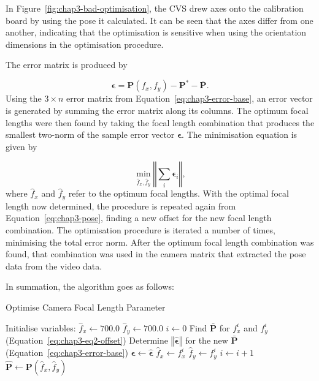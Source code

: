 In Figure~\ref{fig:chap3-bad-optimisation}, the CVS drew axes onto the calibration board by using the pose it calculated. It can be seen that the axes differ from one another, indicating that the optimisation is sensitive when using the orientation dimensions in the optimisation procedure. 

The error matrix is produced by

\begin{equation}
  \label{eq:chap3-error-base}
  \bm{\epsilon} = \bm{P}(f_x, f_y) - \bm{P}^* - \bar{\bm{P}}.
\end{equation}
Using the $3\times n$ error matrix from Equation~\ref{eq:chap3-error-base}, an error vector is generated by summing the error matrix along its columns. The optimum focal lengths were then found by taking the focal length combination that produces the smallest two-norm of the sample error vector $\bm{\epsilon}$. The minimisation equation is given by 

\begin{equation}
  \label{eq:chap3-err-min}
  \min_{\hat{f}_x, \hat{f}_y}\left \Vert \sum_i  \bm{\epsilon}_i \right \Vert,
\end{equation}
where $\hat{f}_x$ and $\hat{f}_y$ refer to the optimum focal lengths. With the optimal focal length now determined, the procedure is repeated again from Equation~\ref{eq:chap3-pose}, finding a new offset for the new focal length combination. The optimisation procedure is iterated a number of times, minimising the total error norm. After the optimum focal length combination was found, that combination was used in the camera matrix that extracted the pose data from the video data.

In summation, the algorithm goes as follows: 

\begin{algorithm}
  \centering
  \caption{Optimise Camera Focal Length Parameter}
  \label{alg:optimal}
  \begin{algorithmic}
    \State Initialise variables: 
      \State $\hat{f}_x \gets 700.0$
      \State $\hat{f}_y \gets 700.0$
      \State $i \gets 0$
      \State Find $\bm{\bar{P}}$ for $f_x^i$ and $f_y^i$ (Equation~\ref{eq:chap3-eq2-offset})
      \State Determine $\left \Vert \hat{\bm{\epsilon}} \right \Vert$ for the new $\bm{\bar{P}}$ (Equation~\ref{eq:chap3-error-base})
      \If{$\left \Vert \hat{\bm{\epsilon}} \right \Vert < \left \Vert \bm{\epsilon} \right \Vert$}
        \State $\bm{\epsilon} \gets \hat{\bm{\epsilon}}$
	\State $\hat{f}_x \gets f_x^i$
	\State $\hat{f}_y \gets f_y^i$
      \EndIf
      \State $i \gets i + 1$
    \EndWhile
    \State $\hat{\bm{P}} \gets \bm{P}(\hat{f}_x, \hat{f}_y)$
  \end{algorithmic}
\end{algorithm}

